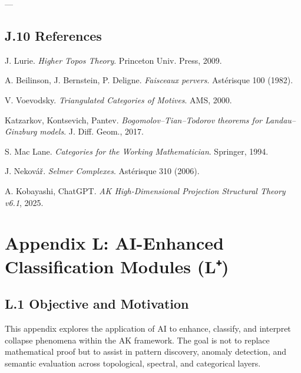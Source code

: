 \documentclass[11pt]{article}
\begin{document}
\begin{axiom}
\begin{axiom}
---

\subsection*{J.10 References}

\begin{thebibliography}{9}

J. Lurie.  
\textit{Higher Topos Theory}. Princeton Univ. Press, 2009.

A. Beilinson, J. Bernstein, P. Deligne.  
\textit{Faisceaux pervers}. Astérisque 100 (1982).

V. Voevodsky.  
\textit{Triangulated Categories of Motives}. AMS, 2000.

Katzarkov, Kontsevich, Pantev.  
\textit{Bogomolov–Tian–Todorov theorems for Landau–Ginzburg models}. J. Diff. Geom., 2017.

S. Mac Lane.  
\textit{Categories for the Working Mathematician}. Springer, 1994.

J. Nekovář.  
\textit{Selmer Complexes}. Astérisque 310 (2006).

A. Kobayashi, ChatGPT.  
\textit{AK High-Dimensional Projection Structural Theory v6.1}, 2025.

\end{thebibliography}



\section*{Appendix L: AI-Enhanced Classification Modules (L⁺)}

\subsection*{L.1 Objective and Motivation}

This appendix explores the application of AI to enhance, classify, and interpret collapse phenomena within the AK framework.  
The goal is not to replace mathematical proof but to assist in pattern discovery, anomaly detection, and semantic evaluation  
across topological, spectral, and categorical layers.


\end{axiom}
\end{axiom}
\end{document}
